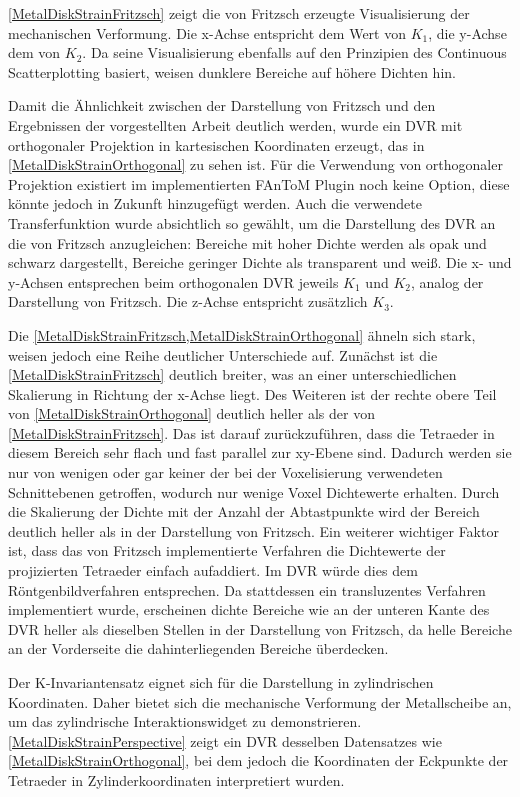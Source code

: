 \documentclass[a4paper,fontsize=12pt,toc=bib,parskip=half,ngerman]{scrartcl}
\begin{document}
\cref{MetalDiskStrainFritzsch} zeigt die von Fritzsch erzeugte Visualisierung der mechanischen Verformung. Die x-Achse entspricht dem Wert von $K_1$, die y-Achse dem von $K_2$. Da seine Visualisierung ebenfalls auf den Prinzipien des Continuous Scatterplotting basiert, weisen dunklere Bereiche auf h\"ohere Dichten hin.

Damit die \"Ahnlichkeit zwischen der Darstellung von Fritzsch und den Ergebnissen der vorgestellten Arbeit deutlich werden, wurde ein DVR mit orthogonaler Projektion in kartesischen Koordinaten erzeugt, das in \cref{MetalDiskStrainOrthogonal} zu sehen ist. F\"ur die Verwendung von orthogonaler Projektion existiert im implementierten FAnToM Plugin noch keine Option, diese k\"onnte jedoch in Zukunft hinzugef\"ugt werden. Auch die verwendete Transferfunktion wurde absichtlich so gew\"ahlt, um die Darstellung des DVR an die von Fritzsch anzugleichen: Bereiche mit hoher Dichte werden als opak und schwarz dargestellt, Bereiche geringer Dichte als transparent und wei{\ss}. Die x- und y-Achsen entsprechen beim orthogonalen DVR jeweils $K_1$ und $K_2$, analog der Darstellung von Fritzsch. Die z-Achse entspricht zus\"atzlich $K_3$.

Die \cref{MetalDiskStrainFritzsch,MetalDiskStrainOrthogonal} \"ahneln sich stark, weisen jedoch eine Reihe deutlicher Unterschiede auf. Zun\"achst ist die \cref{MetalDiskStrainFritzsch} deutlich breiter, was an einer unterschiedlichen Skalierung in Richtung der x-Achse liegt. Des Weiteren ist der rechte obere Teil von \cref{MetalDiskStrainOrthogonal} deutlich heller als der von \cref{MetalDiskStrainFritzsch}. Das ist darauf zur\"uckzuf\"uhren, dass die Tetraeder in diesem Bereich sehr flach und fast parallel zur xy-Ebene sind. Dadurch werden sie nur von wenigen oder gar keiner der bei der Voxelisierung verwendeten Schnittebenen getroffen, wodurch nur wenige Voxel Dichtewerte erhalten. Durch die Skalierung der Dichte mit der Anzahl der Abtastpunkte wird der Bereich deutlich heller als in der Darstellung von Fritzsch. Ein weiterer wichtiger Faktor ist, dass das von Fritzsch implementierte Verfahren die Dichtewerte der projizierten Tetraeder einfach aufaddiert. Im DVR w\"urde dies dem R\"ontgenbildverfahren entsprechen. Da stattdessen ein transluzentes Verfahren implementiert wurde, erscheinen dichte Bereiche wie an der unteren Kante des DVR heller als dieselben Stellen in der Darstellung von Fritzsch, da helle Bereiche an der Vorderseite die dahinterliegenden Bereiche \"uberdecken.

Der K-Invariantensatz eignet sich f\"ur die Darstellung in zylindrischen Koordinaten. Daher bietet sich die mechanische Verformung der Metallscheibe an, um das zylindrische Interaktionswidget zu demonstrieren. \cref{MetalDiskStrainPerspective} zeigt ein DVR desselben Datensatzes wie \cref{MetalDiskStrainOrthogonal}, bei dem jedoch die Koordinaten der Eckpunkte der Tetraeder in Zylinderkoordinaten interpretiert wurden.
\end{document}
